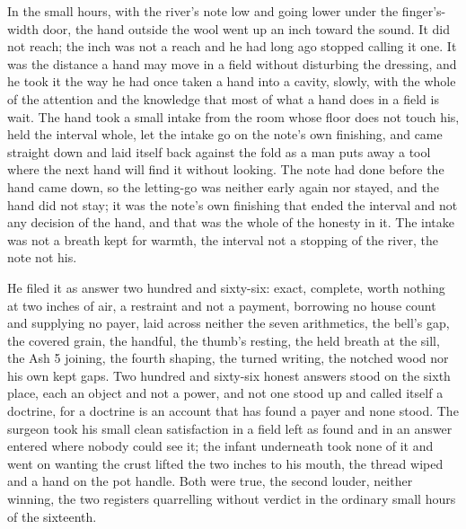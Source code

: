In the small hours, with the river's note low and going lower under the finger's-width door, the hand outside the wool went up an inch toward the sound. It did not reach; the inch was not a reach and he had long ago stopped calling it one. It was the distance a hand may move in a field without disturbing the dressing, and he took it the way he had once taken a hand into a cavity, slowly, with the whole of the attention and the knowledge that most of what a hand does in a field is wait. The hand took a small intake from the room whose floor does not touch his, held the interval whole, let the intake go on the note's own finishing, and came straight down and laid itself back against the fold as a man puts away a tool where the next hand will find it without looking. The note had done before the hand came down, so the letting-go was neither early again nor stayed, and the hand did not stay; it was the note's own finishing that ended the interval and not any decision of the hand, and that was the whole of the honesty in it. The intake was not a breath kept for warmth, the interval not a stopping of the river, the note not his.

He filed it as answer two hundred and sixty-six: exact, complete, worth nothing at two inches of air, a restraint and not a payment, borrowing no house count and supplying no payer, laid across neither the seven arithmetics, the bell's gap, the covered grain, the handful, the thumb's resting, the held breath at the sill, the Ash 5 joining, the fourth shaping, the turned writing, the notched wood nor his own kept gaps. Two hundred and sixty-six honest answers stood on the sixth place, each an object and not a power, and not one stood up and called itself a doctrine, for a doctrine is an account that has found a payer and none stood. The surgeon took his small clean satisfaction in a field left as found and in an answer entered where nobody could see it; the infant underneath took none of it and went on wanting the crust lifted the two inches to his mouth, the thread wiped and a hand on the pot handle. Both were true, the second louder, neither winning, the two registers quarrelling without verdict in the ordinary small hours of the sixteenth.

